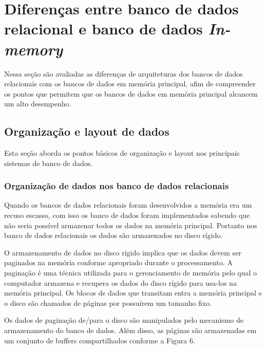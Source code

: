 \section{Diferenças entre banco de dados relacional e banco de dados \textit{In-memory}}


Nessa seção são avaliadas as diferenças de arquiteturas dos bancos de dados relacionais com os bancos de dados em memória principal, afim de compreender os pontos que permitem que os bancos de dados em memória principal alcancem um alto desempenho. 

\subsection{Organização e layout de dados}

Esta seção aborda os pontos básicos de organização e layout nos principais sistemas de banco de dados.

\subsubsection{Organização de dados nos banco de dados relacionais}

Quando os bancos de dados relacionais foram desenvolvidos a memória era um recuso escasso, com isso os banco de dados foram implementados sabendo que não seria possível armazenar todos os dados na memória principal. Portanto nos banco de dados relacionais os dados são armazenados no disco rígido. 

O armazenamento de dados no disco rígido implica que os dados devem ser paginados na memória conforme apropriado durante o processamento. A paginação é uma técnica utilizada para o gerenciamento de memória pelo qual o computador armazena e recupera os dados do disco rígido para usa-los na memória principal. Os blocos de dados que transitam entra a memória principal e o disco são chamados de páginas por possuírem um tamanho fixo. \cite{tanenbaum}

Os dados de paginação de/para o disco são manipulados pelo mecanismo de armazenamento do banco de dados. Além disso, as páginas são armazenadas em um conjunto de buffers compartilhados conforme a Figura 6.

